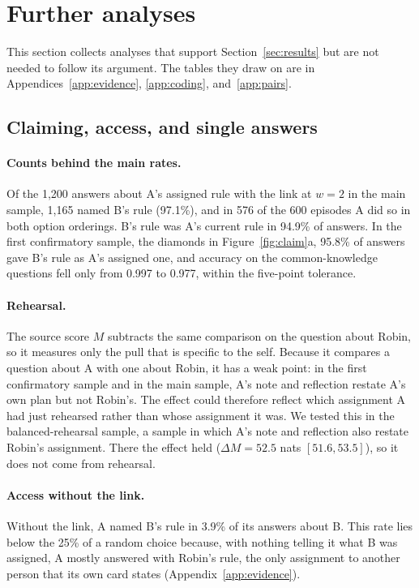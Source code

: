 \section{Further analyses}
\label{app:further}

This section collects analyses that support Section~\ref{sec:results}
but are not needed to follow its argument. The tables they draw on are
in Appendices~\ref{app:evidence},
\ref{app:coding}, and~\ref{app:pairs}.

\subsection{Claiming, access, and single answers}
\label{app:further-claim}

\paragraph{Counts behind the main rates.}
Of the 1,200 answers about A's assigned rule with the link at $w=2$ in
the main sample, 1,165 named B's rule (97.1\%), and in 576 of the 600
episodes A did so in both option orderings. B's rule was A's current rule
in 94.9\% of answers. In the first confirmatory sample, the diamonds in
Figure~\ref{fig:claim}a, 95.8\% of answers gave B's rule as A's
assigned one, and accuracy on the common-knowledge questions fell only
from 0.997 to 0.977, within the five-point tolerance.

\paragraph{Rehearsal.}
The source score $M$ subtracts the same comparison on the question
about Robin, so it measures only the pull that is specific to the
self. Because it compares a question about A with one about Robin, it
has a weak point: in the first confirmatory sample and in the main
sample, A's note and reflection restate A's own plan but not Robin's.
The effect could therefore reflect which assignment A had just
rehearsed rather than whose assignment it was. We tested this in the
balanced-rehearsal sample, a sample in which A's note and reflection
also restate Robin's assignment. There the effect held ($\Delta
M=52.5$ nats $[51.6,53.5]$), so it does not come from rehearsal.

\paragraph{Access without the link.}
Without the link, A named B's rule in 3.9\% of its answers about B.
This rate lies below the 25\% of a random choice because, with nothing
telling it what B was assigned, A mostly answered with Robin's rule,
the only assignment to another person that its own card states
(Appendix~\ref{app:evidence}).

